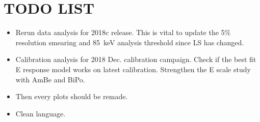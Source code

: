 \documentclass{article}
\begin{document}
\section{TODO LIST}
\begin{itemize}
    \item Rerun data analysis for 2018c release. This is vital to update the 5\% resolution smearing and 85~keV analysis threshold since LS has changed.
    \item Calibration analysis for 2018 Dec. calibration campaign. Check if the best fit E response model works on latest calibration. Strengthen the E scale study with AmBe and BiPo.
    \item Then every plots should be remade.
    \item Clean language.
\end{itemize}
\end{document}

